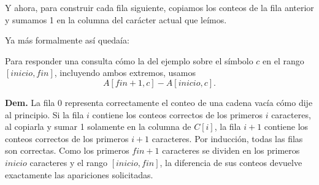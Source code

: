 \documentclass{article}
\begin{document}
\begin{enumerate}
        Y ahora, para construir cada fila siguiente, copiamos los conteos
        de la fila anterior y sumamos 1 en la columna del car\'acter actual que leímos.

        Ya más formalmente así quedaía:

        \noindent\begin{minipage}{\linewidth}
        \begin{algorithm}[H]
            \DontPrintSemicolon
            \caption{Preprocesamiento de la cadena}
        \end{algorithm}
        \end{minipage}

        Para responder una consulta cómo la del ejemplo sobre el s\'imbolo $c$ en el rango
        $[inicio,fin]$, incluyendo ambos extremos, usamos
        \[
            A[fin+1,c]-A[inicio,c].
        \]

        \noindent\begin{minipage}{\linewidth}
        \begin{algorithm}[H]
            \DontPrintSemicolon
            \caption{Consulta de apariciones en un rango}
        \end{algorithm}
        \end{minipage}

        \medskip
        \textbf{Dem.} La fila 0 representa correctamente el conteo
        de una cadena vac\'ia cómo dije al principio. Si la fila $i$ contiene los conteos correctos
        de los primeros $i$ caracteres, al copiarla y sumar 1 solamente
        en la columna de $C[i]$, la fila $i+1$ contiene los conteos correctos
        de los primeros $i+1$ caracteres. Por inducci\'on, todas las filas
        son correctas. Como los primeros $fin+1$ caracteres se dividen en los
        primeros $inicio$ caracteres y el rango $[inicio,fin]$, la diferencia de sus
        conteos devuelve exactamente las apariciones solicitadas.


\end{enumerate}
\end{document}
